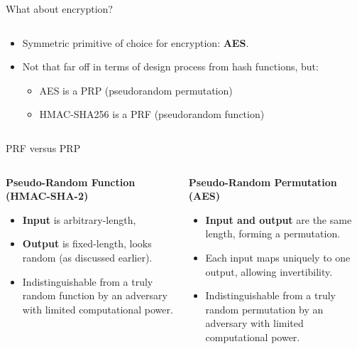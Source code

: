 \documentclass[aspectratio=169, lualatex, handout]{beamer}
\begin{document}
\begin{frame}{What about encryption?}
	\begin{columns}[c]
		\begin{column}{0.6\textwidth}
			\begin{itemize}[<+->]
				\item Symmetric primitive of choice for encryption: \textbf{AES}.
				\item Not that far off in terms of design process from hash functions,
				      but:
				      \begin{itemize}[<+->]
					      \item AES is a PRP (pseudorandom permutation)
					      \item HMAC-SHA256 is a PRF (pseudorandom function)
				      \end{itemize}
			\end{itemize}
		\end{column}

		\begin{column}{0.4\textwidth}
		\end{column}
	\end{columns}
\end{frame}

\begin{frame}{PRF versus PRP}
	\begin{columns}[c]
		\begin{column}{0.5\textwidth}
			\textbf{Pseudo-Random Function (HMAC-SHA-2)}
			\begin{itemize}[<+->]
				\item \textbf{Input} is arbitrary-length,
				\item \textbf{Output} is fixed-length, looks random (as discussed
				      earlier).
				\item Indistinguishable from a truly random function by an adversary with
				      limited computational power.
			\end{itemize}
		\end{column}

		\begin{column}{0.5\textwidth}
			\textbf{Pseudo-Random Permutation (AES)}
			\begin{itemize}[<+->]
				\item \textbf{Input and output} are the same length, forming a permutation.
				\item Each input maps uniquely to one output, allowing invertibility.
				\item Indistinguishable from a truly random permutation by an adversary
				      with limited computational power.
			\end{itemize}
		\end{column}
	\end{columns}
\end{frame}
\end{document}
